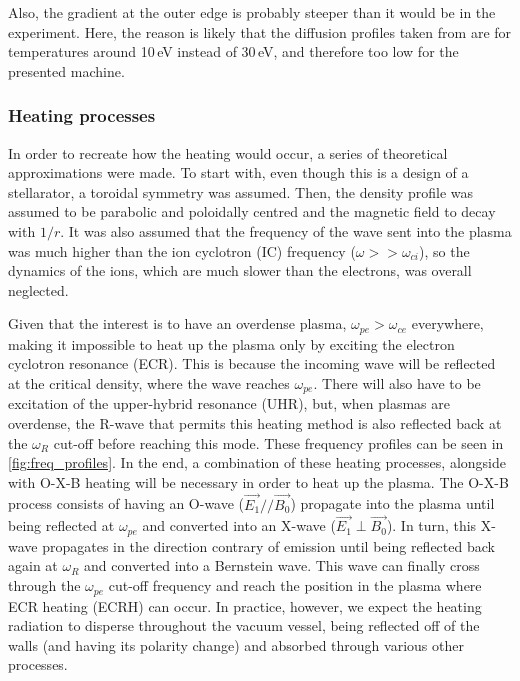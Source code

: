 \par Also, the gradient at the outer edge is probably steeper than it would be in the experiment. Here, the reason is likely that the diffusion profiles taken from \cite{birkenmaierModeling2008} are for temperatures around 10\,eV instead of 30\,eV, and therefore too low for the presented machine.

\subsubsection{Heating processes}  %
In order to recreate how the heating would occur, a series of theoretical approximations were made.
To start with, even though this is a design of a stellarator, a toroidal symmetry was assumed.
Then, the density profile was assumed to be parabolic and poloidally centred and the magnetic field to decay with $1/r$.
It was also assumed that the frequency of the wave sent into the plasma was much higher than the ion cyclotron (IC) frequency ($\omega >> \omega_{ci}$), so the dynamics of the ions, which are much slower than the electrons, was overall neglected.

Given that the interest is to have an overdense plasma, $\omega_{pe} > \omega_{ce}$ everywhere, making it impossible to heat up the plasma only by exciting the electron cyclotron resonance (ECR).
This is because the incoming wave will be reflected at the critical density, where the wave reaches $\omega_{pe}$.
There will also have to be excitation of the upper-hybrid resonance (UHR), but, when plasmas are overdense, the R-wave that permits this heating method is also reflected back at the $\omega_R$ cut-off before reaching this mode.
These frequency profiles can be seen in \autoref{fig:freq_profiles}.
In the end, a combination of these heating processes, alongside with O-X-B heating will be necessary in order to heat up the plasma.
The O-X-B process consists of having an O-wave ($\overrightarrow{E_1} // \overrightarrow{B_0}$) propagate into the plasma until being reflected at $\omega_{pe}$ and converted into an X-wave ($\overrightarrow{E_1} \perp \overrightarrow{B_0}$).
In turn, this X-wave propagates in the direction contrary of emission until being reflected back again at $\omega_R$ and converted into a Bernstein wave.   
This wave can finally cross through the $\omega_{pe}$ cut-off frequency and reach the position in the plasma where ECR heating (ECRH) can occur.
In practice, however, we expect the heating radiation to disperse throughout the vacuum vessel, being reflected off of the walls (and having its polarity change) and absorbed through various other processes.

